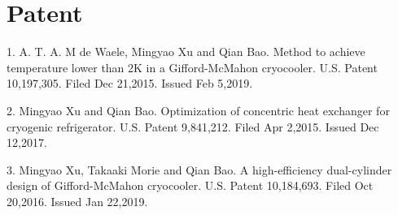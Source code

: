 \documentclass[letterpaper,11pt]{article}
\begin{document}
\section{Patent}
1. A. T. A. M de Waele, Mingyao Xu and Qian Bao. Method to achieve temperature lower than 2K in a Gifford-McMahon cryocooler. U.S. Patent 10,197,305. Filed Dec 21,2015. Issued Feb 5,2019.

2. Mingyao Xu and Qian Bao. Optimization of concentric heat exchanger for cryogenic refrigerator. U.S. Patent 9,841,212. Filed Apr 2,2015. Issued Dec 12,2017.

3. Mingyao Xu, Takaaki Morie and Qian Bao. A high-efficiency dual-cylinder design of Gifford-McMahon cryocooler. U.S. Patent 10,184,693. Filed Oct 20,2016. Issued Jan 22,2019.
\end{document}
